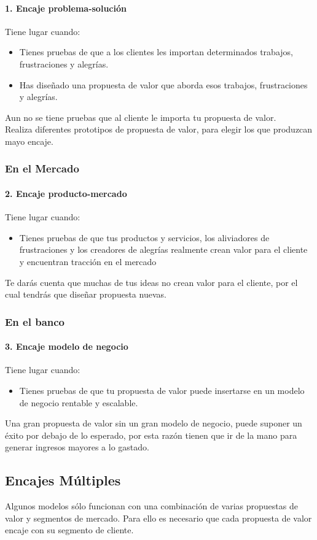 \documentclass[11pt]{book}
\begin{document}
\paragraph{1. Encaje problema-solución} 
Tiene lugar cuando:
\begin{itemize}
\item Tienes pruebas de que a los clientes les importan determinados trabajos, frustraciones y alegrías.
\item Has diseñado una propuesta de valor que aborda esos trabajos, frustraciones y alegrías.
\end{itemize}
Aun no se tiene pruebas que al cliente le importa tu propuesta de valor.\\
Realiza diferentes prototipos de propuesta de valor, para elegir los que produzcan mayo encaje.
\subsubsection{En el Mercado}
\paragraph{2. Encaje producto-mercado}
Tiene lugar cuando:
\begin{itemize}
\item Tienes pruebas de que tus productos y servicios, los aliviadores de frustraciones y los creadores de alegrías realmente crean valor para el cliente y encuentran tracción en el mercado
\end{itemize}
Te darás cuenta que muchas de tus ideas no crean valor para el cliente, por el cual tendrás que diseñar propuesta nuevas.

\subsubsection{En el banco}
\paragraph{3. Encaje modelo de negocio}
Tiene lugar cuando:
\begin{itemize}
 \item Tienes pruebas de que tu propuesta de valor puede insertarse en un modelo de negocio rentable y escalable.
\end{itemize}
Una gran propuesta de valor sin un gran modelo de negocio, puede suponer un éxito por debajo de lo esperado, por esta razón tienen que ir de la mano para generar ingresos mayores a lo gastado.
\subsection{Encajes Múltiples}
Algunos modelos sólo funcionan con una combinación de varias propuestas de valor y segmentos de mercado. Para ello es necesario que cada propuesta de valor encaje con su segmento de cliente.
\end{document}
